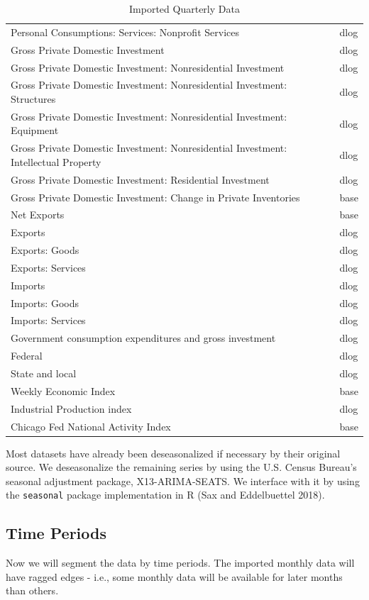 \documentclass[11pt, letterpaper]{article}\usepackage[]{graphicx}\usepackage[]{color}
\begin{document}
\begin{table}[!h]
\begin{tabular}{ll}
  Personal Consumptions: Services: Nonprofit Services & dlog \\ 
  Gross Private Domestic Investment & dlog \\ 
  Gross Private Domestic Investment: Nonresidential Investment & dlog \\ 
  Gross Private Domestic Investment: Nonresidential Investment: Structures & dlog \\ 
  Gross Private Domestic Investment: Nonresidential Investment: Equipment & dlog \\ 
  Gross Private Domestic Investment: Nonresidential Investment: Intellectual Property & dlog \\ 
  Gross Private Domestic Investment: Residential Investment & dlog \\ 
  Gross Private Domestic Investment: Change in Private Inventories & base \\ 
  Net Exports & base \\ 
  Exports & dlog \\ 
  Exports: Goods & dlog \\ 
  Exports: Services & dlog \\ 
  Imports & dlog \\ 
  Imports: Goods & dlog \\ 
  Imports: Services & dlog \\ 
  Government consumption expenditures and gross investment & dlog \\ 
  Federal & dlog \\ 
  State and local & dlog \\ 
  Weekly Economic Index & base \\ 
  Industrial Production index & dlog \\ 
  Chicago Fed National Activity Index & base \\ 
   \hline
\end{tabular}
\endgroup
\caption{Imported Quarterly Data} 
\end{table}


Most datasets have already been deseasonalized if necessary by their original source. We deseasonalize the remaining series by using the U.S. Census Bureau's seasonal adjustment package, X13-ARIMA-SEATS. We interface with it by using the \texttt{seasonal} package implementation in R (Sax and Eddelbuettel 2018).

\subsection{Time Periods}
Now we will segment the data by time periods. The imported monthly data will have ragged edges - i.e., some monthly data will be available for later months than others.
\end{document}
